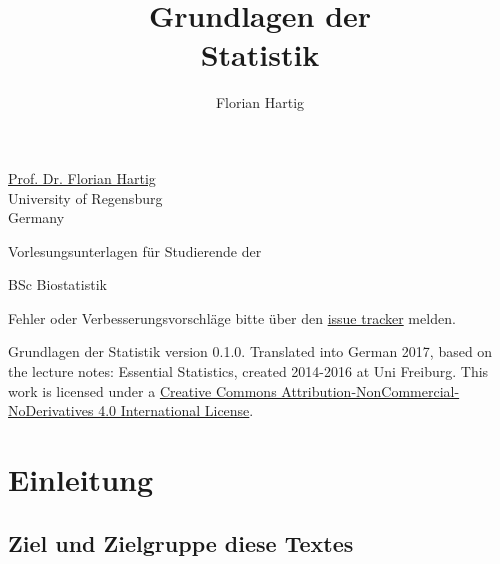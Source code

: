 \documentclass[a4paper,twoside]{tufte-book}\usepackage[]{graphicx}\usepackage[]{color}
\title{Grundlagen der\\Statistik}
\author{Florian Hartig}
\begin{document}

\let\cleardoublepage\clearpage %
\maketitle


\thispagestyle{empty}
\null


\href{http://www.uni-regensburg.de/biologie-vorklinische-medizin/theoretische-oekologie/mitarbeiter/hartig/index.html}{Prof. Dr. Florian Hartig}\\
University of Regensburg\\
Germany\\[0.5cm]

\begin{fullwidth}
Vorlesungsunterlagen für Studierende der

\begin{itemize*}
  \item BSc Biostatistik
\end{itemize*}

\vspace{0.5cm}

Fehler oder Verbesserungsvorschläge bitte über den \href{https://github.com/florianhartig/Statistics/issues}{issue tracker} melden. 

\end{fullwidth}


\vfill
\begin{fullwidth}
Grundlagen der Statistik version 0.1.0. Translated into German 2017, based on the lecture notes: Essential Statistics, created 2014-2016 at Uni Freiburg. This work is licensed under a \href{https://creativecommons.org/licenses/by-nc-nd/4.0/}{Creative Commons Attribution-NonCommercial-NoDerivatives 4.0 International License}. 
\end{fullwidth}


\newpage
\tableofcontents

\chapter{Einleitung} %

	\section{Ziel und Zielgruppe diese Textes}
	
\end{document}
